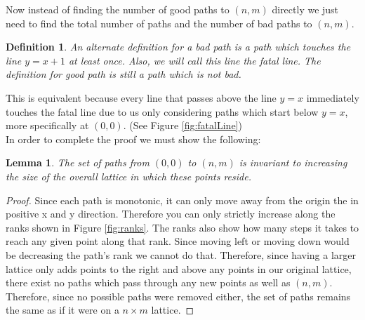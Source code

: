 \documentclass[letterpaper, 12pt]{article}
\newtheorem{lemma}[theorem]{Lemma}
\newtheorem{definition}[theorem]{Definition}
\begin{document}
Now instead of finding the number of good paths to $(n,m)$ directly we just need to find the total number of paths and the number of bad paths to $(n,m)$.
\begin{definition}
An alternate definition for a bad path is a path which touches the line $y=x+1$ at least once. Also, we will call this line the fatal line. The definition for good path is still a path which is not bad.
\end{definition}
This is equivalent because every line that passes above the line $y=x$ immediately touches the fatal line due to us only considering paths which start below $y=x$, more specifically at $(0,0)$. (See Figure \ref{fig:fatalLine})\\

In order to complete the proof we must show the following:
\begin{lemma}\label{lem:extendLattice}
    The set of paths from $(0,0)$ to $(n,m)$ is invariant to increasing the size of the overall lattice in which these points reside.
\end{lemma}
\begin{proof}
    Since each path is monotonic, it can only move away from the origin the in positive x and y direction. Therefore you can only strictly increase along the ranks shown in Figure \ref{fig:ranks}. The ranks also show how many steps it takes to reach any given point along that rank. Since moving left or moving down would be decreasing the path's rank we cannot do that. Therefore, since having a larger lattice only adds points to the right and above any points in our original lattice, there exist no paths which pass through any new points as well as $(n,m)$. Therefore, since no possible paths were removed either, the set of paths remains the same as if it were on a $n\times m$ lattice.
\end{proof}
\newpage
\end{document}

